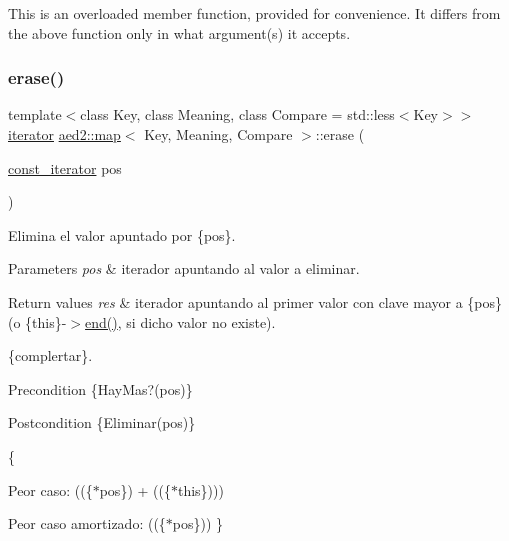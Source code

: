 This is an overloaded member function, provided for convenience. It differs from the above function only in what argument(s) it accepts. \mbox{\label{classaed2_1_1map_ad8e796bf9c9c558e5ce6b61e116253fe}} 
\subsubsection{\texorpdfstring{erase()}{erase()}\hspace{0.1cm}{\footnotesize\ttfamily [1/2]}}
{\footnotesize\ttfamily template$<$class Key, class Meaning, class Compare = std\+::less$<$\+Key$>$$>$ \\
\hyperlink{classaed2_1_1map_1_1iterator}{iterator} \hyperlink{classaed2_1_1map}{aed2\+::map}$<$ Key, Meaning, Compare $>$\+::erase (\begin{DoxyParamCaption}\item[{\hyperlink{classaed2_1_1map_1_1const__iterator}{const\+\_\+iterator}}]{pos }\end{DoxyParamCaption})\hspace{0.3cm}{\ttfamily [inline]}}



Elimina el valor apuntado por \{pos\}. 


\begin{DoxyParams}{Parameters}
{\em pos} & iterador apuntando al valor a eliminar. \\
\hline
\end{DoxyParams}

\begin{DoxyRetVals}{Return values}
{\em res} & iterador apuntando al primer valor con clave mayor a \{pos\} (o \{this\}-\/$>$\hyperlink{classaed2_1_1map_a76023e6a56cb625513e1b5ea028bf983}{end()}, si dicho valor no existe).\\
\hline
\end{DoxyRetVals}
\{complertar\}.

\begin{DoxyPrecond}{Precondition}
\{Hay\+Mas?(pos)\} 
\end{DoxyPrecond}
\begin{DoxyPostcond}{Postcondition}
\{Eliminar(pos)\}
\end{DoxyPostcond}
\{
\begin{DoxyItemize}
\item Peor caso\+: ((\{$\ast$pos\}) + ((\{$\ast$this\})))
\item Peor caso amortizado\+: ((\{$\ast$pos\})) \} 
\end{DoxyItemize}\mbox{\label{classaed2_1_1map_ad8e796bf9c9c558e5ce6b61e116253fe}} 

